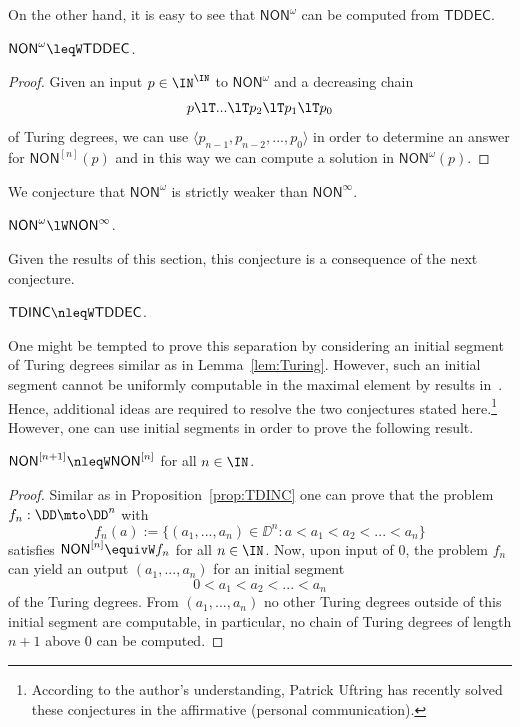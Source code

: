 \documentclass{lmcs}
\def\TDINC{\mathsf{TDINC}}
\def\TDDEC{\mathsf{TDDEC}}
\def\NON{\mathsf{NON}}
\begin{document}
\noindent
On the other hand, it is easy to see that $\NON^\omega$ can be computed from $\TDDEC$.

\begin{prop}
$\NON^\omega\leqW\TDDEC$.
\end{prop}
\begin{proof}
Given an input $p\in\IN^\IN$ to $\NON^\omega$ and a decreasing chain 
\[p\lT ...\lT p_2\lT p_1\lT p_0\]
of Turing degrees,
we can use $\langle p_{n-1},p_{n-2},...,p_0\rangle$ in order to determine an answer for $\NON^{[n]}(p)$ and in this way we can
compute a solution in $\NON^\omega(p)$.
\end{proof}

\noindent
We conjecture that $\NON^\omega$ is strictly weaker than $\NON^\infty$.

\begin{conj}
\label{conjecture:NON-omega}
$\NON^\omega\lW\NON^\infty$.
\end{conj}

\noindent
Given the results of this section, this conjecture is a consequence of the next
conjecture.

\begin{conj}
$\TDINC\nleqW\TDDEC$.
\end{conj}

\noindent
One might be tempted to prove this separation by considering an initial segment of Turing
degrees similar as in Lemma~\ref{lem:Turing}. However, such an initial segment cannot
be uniformly computable in the maximal element by results in~\cite{Ish02}.
Hence, additional ideas are required to resolve the two conjectures stated here.\footnote{According to the author's understanding, Patrick Uftring has recently solved these conjectures in the affirmative (personal communication).}
However, one can use initial segments in order to prove the following result.

\begin{prop}
$\NON^{[n+1]}\nleqW\NON^{[n]}$ for all $n\in\IN$.
\end{prop}
\begin{proof}
Similar as in Proposition~\ref{prop:TDINC} one can prove that the problem $f_n:\DD\mto\DD^n$ with
\[f_n(a):=\{(a_1,...,a_n)\in\DD^n:a<a_1<a_2<...<a_n\}\]
satisfies $\NON^{[n]}\equivW f_n$ for all $n\in\IN$.
Now, upon input of $0$, the problem $f_n$ can yield an output $(a_1,...,a_n)$
for an initial segment
\[0<a_1<a_2<...<a_n\]
of the Turing degrees. From $(a_1,...,a_n)$ no other Turing degrees outside of this
initial segment are computable, in particular, no chain of Turing degrees of length $n+1$
above $0$ can be computed.
\end{proof}
\end{document}
